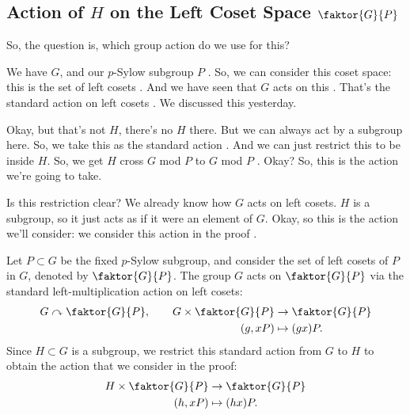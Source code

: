 \begin{proofWrapper}
\subsection{Action of \texorpdfstring{$H$}{H} on the Left Coset Space \texorpdfstring{$\faktor{G}{P}$}{G/P}}

\begin{speech}[00:21:13 - 00:22:44]
So, the question is, which group action do we use for this? 

We have $G$, and our $p$-Sylow subgroup $P$ . So, we can consider this coset space: this is the set of left cosets . And we have seen that $G$ acts on this . That's the standard action on left cosets . We discussed this yesterday.

Okay, but that's not $H$, there's no $H$ there. But we can always act by a subgroup here. So, we take this as the standard action . And we can just restrict this to be inside $H$. So, we get $H$ cross $G$ mod $P$ to $G$ mod $P$ . Okay? So, this is the action we're going to take.

Is this restriction clear? We already know how $G$ acts on left cosets. $H$ is a subgroup, so it just acts as if it were an element of $G$. Okay, so this is the action we'll consider: we consider this action in the proof .
\end{speech}

\begin{content}
Let $P \subset G$ be the fixed $p$-Sylow subgroup, and consider the set of left cosets of $P$ in $G$, denoted by $\faktor{G}{P}$. The group $G$ acts on $\faktor{G}{P}$ via the standard left-multiplication action on left cosets:
\begin{align*}
G \curvearrowright \faktor{G}{P}, \qquad G \times \faktor{G}{P} &\to \faktor{G}{P} \\
(g, xP) &\mapsto (gx)P.
\end{align*}
Since $H \subset G$ is a subgroup, we restrict this standard action from $G$ to $H$ to obtain the action that we consider in the proof:
\begin{align*}
H \times \faktor{G}{P} &\to \faktor{G}{P} \\
(h, xP) &\mapsto (hx)P.
\end{align*}


\end{content}
\end{proofWrapper}
